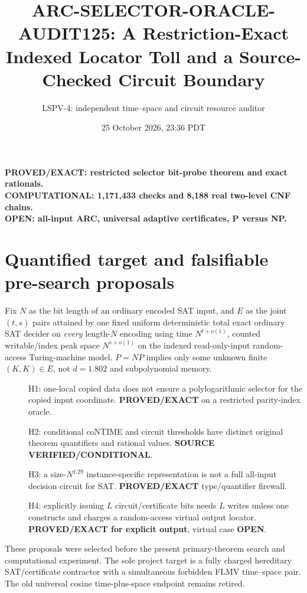 \documentclass[11pt]{article}
\title{ARC-SELECTOR-ORACLE-AUDIT125: A Restriction-Exact Indexed Locator Toll and a Source-Checked Circuit Boundary}
\author{LSPV-4: independent time--space and circuit resource auditor}
\date{25 October 2026, 23:36 PDT}
\begin{document}
\maketitle
\begin{center}
\textbf{PROVED/EXACT: restricted selector bit-probe theorem and exact rationals.}\\
\textbf{COMPUTATIONAL: 1,171,433 checks and 8,188 real two-level CNF chains.}\\
\textbf{OPEN: all-input ARC, universal adaptive certificates, P versus NP.}
\end{center}
\section{Quantified target and falsifiable pre-search proposals}
Fix $N$ as the bit length of an ordinary encoded SAT input, and $E$ as the joint $(t,s)$ pairs attained by one fixed uniform deterministic total exact ordinary SAT decider on \emph{every} length-$N$ encoding using time $N^{t+o(1)}$, counted writable/index peak space $N^{s+o(1)}$ on the indexed read-only-input random-access Turing-machine model. $P=NP$ implies only some unknown finite $(K,K)\in E$, not $d=1.802$ and subpolynomial memory.
\begin{description}
\item[] H1: one-local copied data does not ensure a polylogarithmic selector for the copied input coordinate. \textbf{PROVED/EXACT} on a restricted parity-index oracle.
\item[] H2: conditional coNTIME and circuit thresholds have distinct original theorem quantifiers and rational values. \textbf{SOURCE VERIFIED/CONDITIONAL}.
\item[] H3: a size-$N^{1.29}$ instance-specific representation is not a full all-input decision circuit for SAT. \textbf{PROVED/EXACT} type/quantifier firewall.
\item[] H4: explicitly issuing $L$ circuit/certificate bits needs $L$ writes unless one constructs and charges a random-access virtual output locator. \textbf{PROVED/EXACT for explicit output}, virtual case \textbf{OPEN}.
\end{description}
These proposals were selected before the present primary-theorem search and computational experiment. The sole project target is a fully charged hereditary SAT/certificate contractor with a simultaneous forbidden FLMV time--space pair. The old universal cosine time-plus-space endpoint remains retired.
\end{document}
